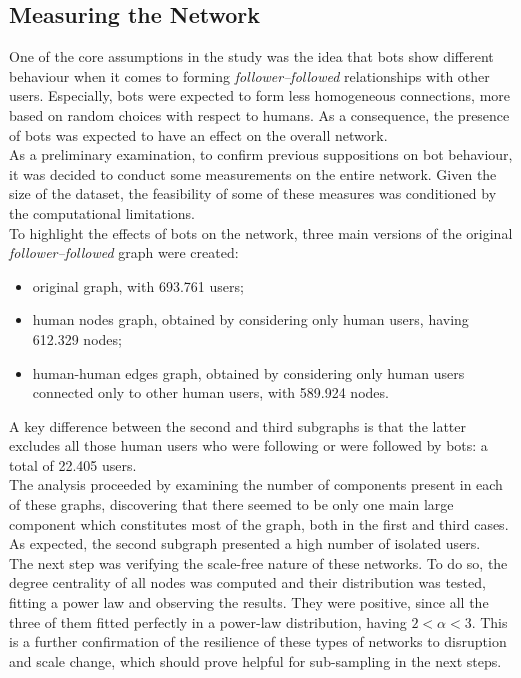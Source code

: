 \documentclass[12pt, a4paper]{article}
\begin{document}
	\subsection{Measuring the Network}
    	One of the core assumptions in the study was the idea that bots show different behaviour when it comes to forming \textit{follower--followed} relationships with other users. Especially, bots were expected to form less homogeneous connections, more based on random choices with respect to humans. As a consequence, the presence of bots was expected to have an effect on the overall network.\\
    	As a preliminary examination, to confirm previous suppositions on bot behaviour, it was decided to conduct some measurements on the entire network. Given the size of the dataset, the feasibility of some of these measures was conditioned by the computational limitations.\\
    	To highlight the effects of bots on the network, three main versions of the original \textit{follower--followed} graph were created: 
        \begin{itemize}
            \item original graph, with 693.761 users;
            \item human nodes graph, obtained by considering only human users, having 612.329 nodes;
            \item human-human edges graph, obtained by considering only human users connected only to other human users, with 589.924 nodes.
        \end{itemize}
        A key difference between the second and third subgraphs is that the latter excludes all those human users who were following or were followed by bots: a total of 22.405 users.\\
        The analysis proceeded by examining the number of components present in each of these graphs, discovering that there seemed to be only one main large component which constitutes most of the graph, both in the first and third cases. As expected, the second subgraph presented a high number of isolated users.\\
        The next step was verifying the scale-free nature of these networks. To do so, the degree centrality of all nodes was computed and their distribution was tested, fitting a power law and observing the results. They were positive, since all the three of them fitted perfectly in a power-law distribution, having \(2<\alpha<3\). This is a further confirmation of the resilience of these types of networks to disruption and scale change, which should prove helpful for sub-sampling in the next steps.\\
\end{document}
